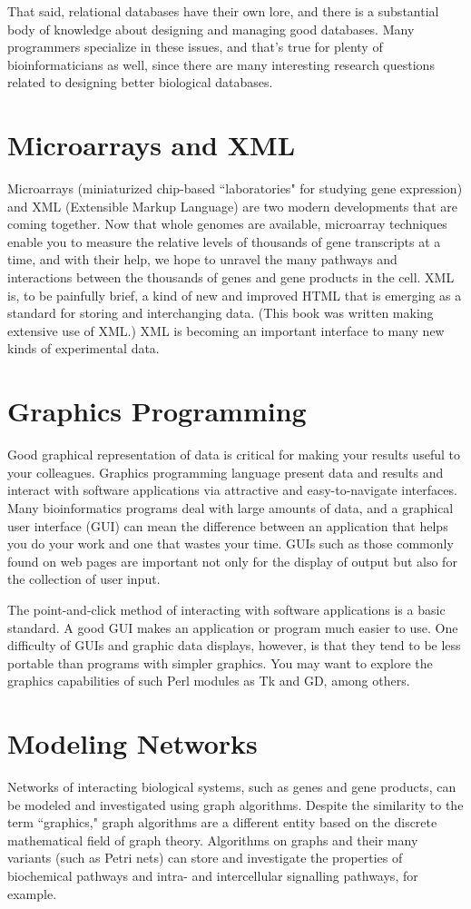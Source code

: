 That said, relational databases have their own lore, and there is a substantial body of knowledge about designing and managing good databases. Many programmers specialize in these issues, and that's true for plenty of bioinformaticians as well, since there are many interesting research questions related to designing better biological databases.

\section{Microarrays and XML}
Microarrays (miniaturized chip-based ``laboratories" for studying gene expression) and XML (Extensible Markup Language) are two modern developments that are coming together. Now that whole genomes are available, microarray techniques enable you to measure the relative levels of thousands of gene transcripts at a time, and with their help, we hope to unravel the many pathways and interactions between the thousands of genes and gene products in the cell. XML is, to be painfully brief, a kind of new and improved HTML that is emerging as a standard for storing and interchanging data. (This book was written making extensive use of XML.) XML is becoming an important interface to many new kinds of experimental data.

\section{Graphics Programming}
Good graphical representation of data is critical for making your results useful to your colleagues. Graphics programming language present data and results and interact with software applications via attractive and easy-to-navigate interfaces. Many bioinformatics programs deal with large amounts of data, and a graphical user interface (GUI) can mean the difference between an application that helps you do your work and one that wastes your time. GUIs such as those commonly found on web pages are important not only for the display of output but also for the collection of user input.

The point-and-click method of interacting with software applications is a basic standard. A good GUI makes an application or program much easier to use. One difficulty of GUIs and graphic data displays, however, is that they tend to be less portable than programs with simpler graphics. You may want to explore the graphics capabilities of such Perl modules as Tk and GD, among others.

\section{Modeling Networks}
Networks of interacting biological systems, such as genes and gene products, can be modeled and investigated using graph algorithms. Despite the similarity to the term ``graphics," graph algorithms are a different entity based on the discrete mathematical field of graph theory. Algorithms on graphs and their many variants (such as Petri nets) can store and investigate the properties of biochemical pathways and intra- and intercellular signalling pathways, for example.

